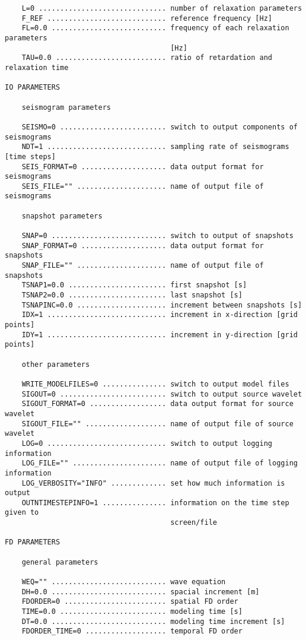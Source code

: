 \begin{verbatim}
    L=0 .............................. number of relaxation parameters
    F_REF ............................ reference frequency [Hz]
    FL=0.0 ........................... frequency of each relaxation parameters 
                                       [Hz]
    TAU=0.0 .......................... ratio of retardation and relaxation time
    
IO PARAMETERS
    
    seismogram parameters
    
    SEISMO=0 ......................... switch to output components of seismograms
    NDT=1 ............................ sampling rate of seismograms [time steps]
    SEIS_FORMAT=0 .................... data output format for seismograms
    SEIS_FILE="" ..................... name of output file of seismograms
    
    snapshot parameters
    
    SNAP=0 ........................... switch to output of snapshots
    SNAP_FORMAT=0 .................... data output format for snapshots
    SNAP_FILE="" ..................... name of output file of snapshots
    TSNAP1=0.0 ....................... first snapshot [s]
    TSNAP2=0.0 ....................... last snapshot [s]
    TSNAPINC=0.0 ..................... increment between snapshots [s]
    IDX=1 ............................ increment in x-direction [grid points]
    IDY=1 ............................ increment in y-direction [grid points]
    
    other parameters
    
    WRITE_MODELFILES=0 ............... switch to output model files
    SIGOUT=0 ......................... switch to output source wavelet
    SIGOUT_FORMAT=0 .................. data output format for source wavelet
    SIGOUT_FILE="" ................... name of output file of source wavelet
    LOG=0 ............................ switch to output logging information
    LOG_FILE="" ...................... name of output file of logging information
    LOG_VERBOSITY="INFO" ............. set how much information is output
    OUTNTIMESTEPINFO=1 ............... information on the time step given to
                                       screen/file

FD PARAMETERS
    
    general parameters
    
    WEQ="" ........................... wave equation
    DH=0.0 ........................... spacial increment [m]
    FDORDER=0 ........................ spatial FD order 
    TIME=0.0 ......................... modeling time [s]
    DT=0.0 ........................... modeling time increment [s]
    FDORDER_TIME=0 ................... temporal FD order
    

\end{verbatim}
